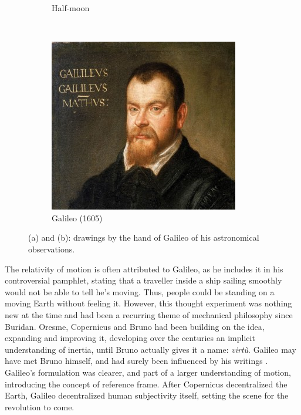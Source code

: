 \begin{figure}
\begin{subfigure}[b]{0.3\textwidth}
        \caption{Half-moon}
        \label{Fig:0_galileo_2}
    \end{subfigure}
        ~~
    \begin{subfigure}[b]{0.3\textwidth}
    	\centering
    	\includegraphics[width=\linewidth]{Figures/0_young_galileo.jpg}
        \caption{Galileo (1605)}
        \label{Fig:0_galileo_3}
    \end{subfigure}
\caption[Galileo's observations and portrait]{(a) and (b): drawings by the hand of Galileo of his astronomical observations.}
\label{Fig:0_galileo}
\end{figure}


The relativity of motion is often attributed to Galileo, as he includes it in his controversial pamphlet, stating that a traveller inside a ship sailing smoothly would not be able to tell he's moving. Thus, people could be standing on a moving Earth without feeling it. However, this thought experiment was nothing new at the time and had been a recurring theme of mechanical philosophy since Buridan. Oresme, Copernicus and Bruno had been building on the idea, expanding and improving it, developing over the centuries an implicit understanding of inertia, until Bruno actually gives it a name: \textit{virt\`u}. Galileo may have met Bruno himself, and had surely been influenced by his writings \citep{DeAngelis2015}. Galileo's formulation was clearer, and part of a larger understanding of motion, introducing the concept of reference frame. After Copernicus decentralized the Earth, Galileo decentralized human subjectivity itself, setting the scene for the revolution to come. 

